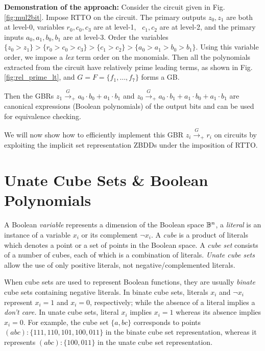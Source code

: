 \begin{Example}
\label{ex1}
{\bf Demonstration of the approach:} Consider the circuit given in
Fig. \ref{fig:mul2bit}. 
Impose RTTO on the circuit. The primary outputs $z_0, z_1$ are both at
level-0, variables $r_0, c_0, c_3$ are at level-1, ~$c_1, c_2$ are at
level-2, and the primary inputs $a_0, a_1, b_0, b_1$ are at
level-3. Order the variables $\{z_0 > z_1\} > \{r_0 > c_0 > c_3\} >
\{c_1 > c_2\} > \{a_0 > a_1 > b_0 > b_1\}$. Using this variable order,
we impose a {\it lex} term order on the monomials. Then all the
polynomials extracted from the circuit have relatively prime leading
terms, as shown in Fig. \ref{fig:rel_prime_lt}, and $G =F = \{f_1, \dots,
f_7\}$ forms a GB. 

Then the GBRs $z_1\xrightarrow{G}_+ a_0\cdot b_0 + a_1\cdot b_1$ and
$z_0\xrightarrow{G}_+a_0\cdot b_1+a_1\cdot b_0 + a_1\cdot b_1$ are
canonical expressions (Boolean polynomials) of the output bits and can
be used for equivalence checking.
\end{Example}


We will now show how to efficiently implement this GBR
$z_i\xrightarrow{G}_+r_i$ on circuits by exploiting the implicit set
representation ZBDDs under the imposition of RTTO. 



\section{Unate Cube Sets \& Boolean Polynomials}
\label{sec:unate}

A Boolean {\it variable} represents a dimension of the Boolean space
${\mathbb{B}}^n$, a {\it literal} 
is an instance of a variable $x_i$ or its 
complement $\neg x_i$. A {\it cube} is a product of literals
which denotes a point or a set of points in the Boolean space. A {\it
  cube set} 
consists of a number of cubes, each of which is a combination of
literals. {\it Unate cube sets} allow the use of only positive
literals, not negative/complemented literals. 

When cube sets are used to represent Boolean functions, they are
usually {\it binate} cube sets containing negative literals. In binate
cube sets, literals $x_i$ and $\neg x_i$ represent $x_i = 1$ and $x_i = 0$,
respectively; while the absence of a literal implies a {\it don't
  care.} In unate cube sets, literal $x_i$ implies $x_i = 1$ whereas
its absence implies $x_i = 0$. For example, the cube set $\{a,
bc\}$ corresponds to points $(abc): \{111, 110, 101, 100, 011\}$ in
the binate cube set representation, whereas it represents $(abc):
\{100, 011\}$ in the unate cube set representation.

